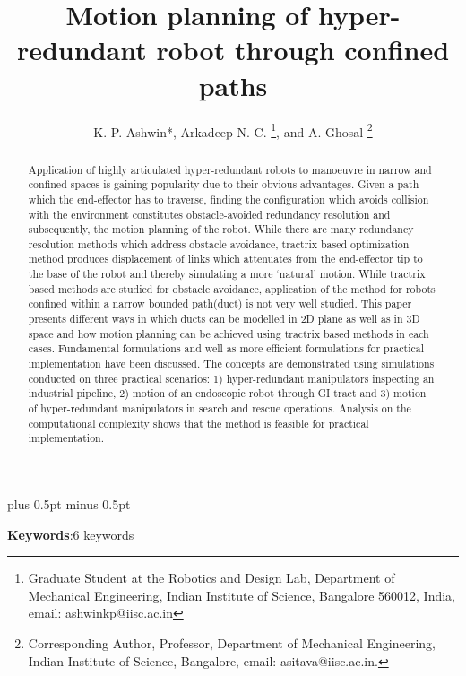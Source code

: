 \documentclass[12pt,a4]{article}
\begin{document}
%
\title{Motion planning of hyper-redundant robot through confined paths}
%
%
\author{K. P. Ashwin*, Arkadeep N. C.
\thanks{Graduate Student at the Robotics and Design Lab, Department
of Mechanical Engineering, Indian Institute of Science, Bangalore 560012, India, email: ashwinkp@iisc.ac.in}, 
 and A. Ghosal
\thanks{Corresponding Author, Professor, Department of Mechanical Engineering, Indian Institute of Science, Bangalore, email: asitava@iisc.ac.in.}}
%
\baselineskip 18pt plus 0.5pt minus 0.5pt
%
\date{}
\maketitle
\begin{abstract}
\label{sec:abstract}

Application of highly articulated hyper-redundant robots to manoeuvre in narrow and confined spaces is gaining popularity due to their obvious advantages. Given a path which the end-effector has to traverse, finding the configuration which avoids collision with the environment constitutes obstacle-avoided redundancy resolution and subsequently, the motion planning of the robot. While there are many redundancy resolution methods which address obstacle avoidance, tractrix based optimization method produces displacement of links which attenuates from the end-effector tip to the base of the robot and thereby simulating a more `natural' motion. While tractrix based methods are studied for obstacle avoidance, application of the method for robots confined within a narrow bounded path(duct) is not very well studied. This paper presents different ways in which ducts can be modelled in 2D plane as well as in 3D space and how motion planning can be achieved using tractrix based methods in each cases. Fundamental formulations and well as more efficient formulations for practical implementation have been discussed. The concepts are demonstrated using simulations conducted on three practical scenarios: 1) hyper-redundant manipulators inspecting an industrial pipeline, 2) motion of an endoscopic robot through GI tract and 3) motion of hyper-redundant manipulators in search and rescue operations. Analysis on the computational complexity shows that the method is feasible for practical implementation. 

\end{abstract}

\textbf{Keywords}:6 keywords
\end{document}
